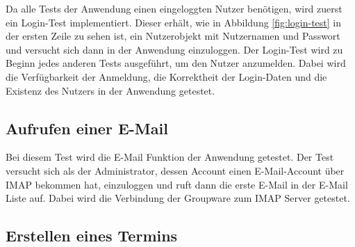 Da alle Tests der Anwendung einen eingeloggten Nutzer benötigen, wird zuerst ein Login-Test implementiert. Dieser erhält, wie in Abbildung \ref{fig:login-test} in der ersten Zeile zu sehen ist, ein Nutzerobjekt mit Nutzernamen und Passwort und versucht sich dann in der Anwendung einzuloggen.
Der Login-Test wird zu Beginn jedes anderen Tests ausgeführt, um den Nutzer anzumelden.
Dabei wird die Verfügbarkeit der Anmeldung, die Korrektheit der Login-Daten und die Existenz des Nutzers in der Anwendung getestet.

\subsection*{Aufrufen einer E-Mail}

Bei diesem Test wird die E-Mail Funktion der Anwendung getestet.
Der Test versucht sich als der Administrator, dessen Account einen E-Mail-Account über IMAP bekommen hat, einzuloggen und ruft dann die erste E-Mail in der E-Mail Liste auf.
Dabei wird die Verbindung der Groupware zum IMAP Server getestet.

\subsection*{Erstellen eines Termins}

